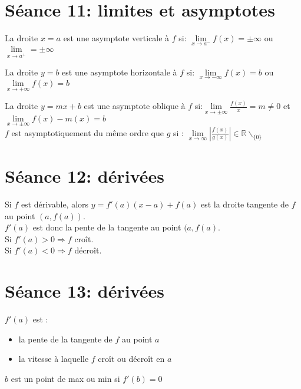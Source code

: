 \documentclass[12pt]{article}
\begin{document}
\section*{S\'eance 11: limites et asymptotes}
\noindent La droite $x = a$ est une asymptote verticale \`a $f$ si: $\underset{x\to a^{-}}\lim f(x) = \pm \infty$ ou $\underset{x\to a^{+}}\lim = \pm \infty$ \\ \newline

\noindent La droite $y = b$ est une asymptote horizontale \`a $f$ si: $\underset{x\to -\infty}\lim f(x) = b$ ou $\underset{x\to +\infty}\lim f(x) = b$ \\ \newline

\noindent La droite $y = mx + b$ est une asymptote oblique \`a $f$ si:\(\underset{x\to \pm \infty}\lim \frac{f(x)}{x} = m \not= 0 \) et \(\underset{x\to \pm \infty}\lim f(x)-m(x) = b \) \\ \newline
$f$ est asymptotiquement du m\^eme ordre que $g$ si : $\underset{x\to \infty}\lim |\frac{f(x)}{g(x)}| \in \mathbb{R}\backslash_{\{0\}}$
\newpage

\section*{S\'eance 12: d\'eriv\'ees}

Si $f$ est d\'erivable, alors $y = f'(a)(x-a)+f(a)$ est la droite tangente de $f$ au point $(a, f(a))$. \\
\indent $f'(a)$ est donc la pente de la tangente au point $(a, f(a)$. \\
\indent Si $f'(a) > 0 \Rightarrow f$ cro\^it. \\
\indent Si $f'(a) < 0 \Rightarrow f$ d\'ecro\^it.

\section*{S\'eance 13: d\'eriv\'ees}

$f'(a)$ est : 
\begin{itemize}\renewcommand{\labelitemi}{$\bullet$}
\item la pente de la tangente de $f$ au point $a$
\item la vitesse \`a laquelle $f$ cro\^it ou d\'ecro\^it en $a$
\end{itemize}
 
\indent $b$ est un point de max ou min si $f'(b) = 0$
\end{document}

